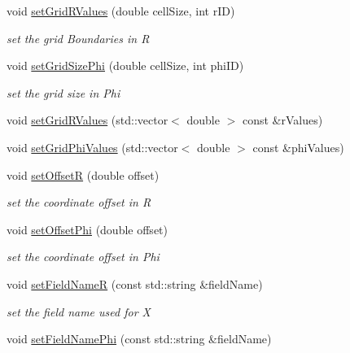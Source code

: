 \begin{DoxyCompactItemize}
void \hyperlink{class_d_d4hep_1_1_d_d_segmentation_1_1_polar_grid_r_phi2_a2194e846c26953f06cc74481d8aadeb4}{set\+Grid\+R\+Values} (double cell\+Size, int r\+ID)
\begin{DoxyCompactList}\small\item\em set the grid Boundaries in R \end{DoxyCompactList}\item 
void \hyperlink{class_d_d4hep_1_1_d_d_segmentation_1_1_polar_grid_r_phi2_a349f115397bac2c6c4891353bcfd88b0}{set\+Grid\+Size\+Phi} (double cell\+Size, int phi\+ID)
\begin{DoxyCompactList}\small\item\em set the grid size in Phi \end{DoxyCompactList}\item 
void \hyperlink{class_d_d4hep_1_1_d_d_segmentation_1_1_polar_grid_r_phi2_a6d8ed0487267fd1b67bc0d76b2f41b3a}{set\+Grid\+R\+Values} (std\+::vector$<$ double $>$ const \&r\+Values)
\item 
void \hyperlink{class_d_d4hep_1_1_d_d_segmentation_1_1_polar_grid_r_phi2_a738e77165e575ee463fab4e5daec543b}{set\+Grid\+Phi\+Values} (std\+::vector$<$ double $>$ const \&phi\+Values)
\item 
void \hyperlink{class_d_d4hep_1_1_d_d_segmentation_1_1_polar_grid_r_phi2_afe071e7c5168bda97cac7c4a64c9265e}{set\+OffsetR} (double offset)
\begin{DoxyCompactList}\small\item\em set the coordinate offset in R \end{DoxyCompactList}\item 
void \hyperlink{class_d_d4hep_1_1_d_d_segmentation_1_1_polar_grid_r_phi2_aa2807e9eae64b363d6a19cc605de5b81}{set\+Offset\+Phi} (double offset)
\begin{DoxyCompactList}\small\item\em set the coordinate offset in Phi \end{DoxyCompactList}\item 
void \hyperlink{class_d_d4hep_1_1_d_d_segmentation_1_1_polar_grid_r_phi2_aac669f48623b5176e941a1e66fde5877}{set\+Field\+NameR} (const std\+::string \&field\+Name)
\begin{DoxyCompactList}\small\item\em set the field name used for X \end{DoxyCompactList}\item 
void \hyperlink{class_d_d4hep_1_1_d_d_segmentation_1_1_polar_grid_r_phi2_a6cd00f3574bc968232a95d1204238c14}{set\+Field\+Name\+Phi} (const std\+::string \&field\+Name)

\end{DoxyCompactItemize}
